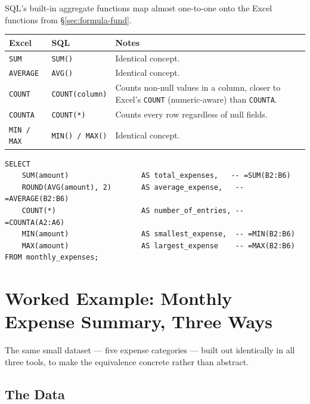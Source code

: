 \documentclass[11pt,a4paper]{article}
\begin{document}
SQL's built-in aggregate functions map almost one-to-one onto the Excel functions from \S\ref{sec:formula-fund}.

\begin{center}
\begin{tabular}{@{}p{2.6cm}p{2.6cm}p{6.0cm}@{}}
\toprule
\textbf{Excel} & \textbf{SQL} & \textbf{Notes} \\
\midrule
\texttt{SUM} & \texttt{SUM()} & Identical concept. \\
\texttt{AVERAGE} & \texttt{AVG()} & Identical concept. \\
\texttt{COUNT} & \texttt{COUNT(column)} & Counts non-null values in a column, closer to Excel's \texttt{COUNT} (numeric-aware) than \texttt{COUNTA}. \\
\texttt{COUNTA} & \texttt{COUNT(*)} & Counts every row regardless of null fields. \\
\texttt{MIN / MAX} & \texttt{MIN() / MAX()} & Identical concept. \\
\bottomrule
\end{tabular}
\end{center}

\begin{lstlisting}[style=sqlstyle, caption={Aggregate query, equivalent to a small block of SUM/AVERAGE/COUNT/MIN/MAX formulas}]
SELECT
    SUM(amount)                 AS total_expenses,   -- =SUM(B2:B6)
    ROUND(AVG(amount), 2)       AS average_expense,   -- =AVERAGE(B2:B6)
    COUNT(*)                    AS number_of_entries, -- =COUNTA(A2:A6)
    MIN(amount)                 AS smallest_expense,  -- =MIN(B2:B6)
    MAX(amount)                 AS largest_expense    -- =MAX(B2:B6)
FROM monthly_expenses;
\end{lstlisting}

\section{Worked Example: Monthly Expense Summary, Three Ways}

The same small dataset --- five expense categories --- built out identically in all three tools, to make the equivalence concrete rather than abstract.

\subsection{The Data}
\end{document}
